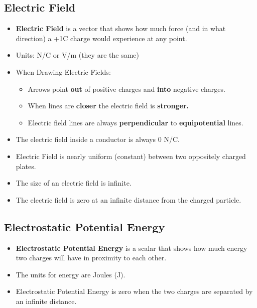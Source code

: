 \documentclass[letterpaper, 12pt]{article}
\begin{document}
\subsection*{Electric Field}
\begin{itemize}
	\item \textbf{Electric Field} is a vector that shows how much force (and in what direction) a +1C charge would experience at any point.
	\item Units: N/C or V/m (they are the same)
	\item When Drawing Electric Fields:
		\begin{itemize}
			\item Arrows point \textbf{out} of positive charges and \textbf{into} negative charges. 
			\item When lines are \textbf{closer} the electric field is \textbf{stronger.}
			\item Electric field lines are always \textbf{perpendicular} to \textbf{equipotential} lines. 
		\end{itemize}
	\item The electric field inside a conductor is always 0 N/C.
	\item Electric Field is nearly uniform (constant) between two oppositely charged plates.
	\item The size of an electric field is infinite. 
	\item The electric field is zero at an infinite distance from the charged particle. 
	\end{itemize}


	
\subsection*{Electrostatic Potential Energy}
	\begin{itemize}
		\item \textbf{Electrostatic Potential Energy} is a scalar that shows how much energy two charges will have in proximity to each other.  
		\item The units for energy are Joules (J). 
		\item Electrostatic Potential Energy is zero when the two charges are separated by an infinite distance. 
	\end{itemize}

	
	


	
\end{document}
